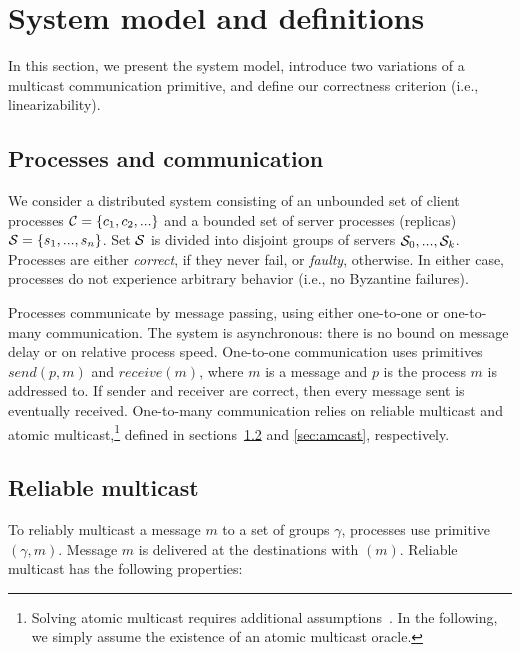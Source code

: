 \section{System model and definitions}
\label{sec:sysmodel}

In this section, we present the system model, introduce two variations of a multicast communication primitive, and define our
correctness criterion (i.e., linearizability). 

\subsection{Processes and communication}

We consider a distributed system consisting of an unbounded set of
client processes $\mathcal{C} = \{c_1, c_2, ...\}$ and a bounded set of
server processes (replicas) $\mathcal{S} = \{s_1, ..., s_n\}$.  Set $\mathcal{S}$ is
divided into disjoint groups of servers $\mathcal{S}_0, ..., \mathcal{S}_k$.
Processes are either \emph{correct}, if they never fail, or
\emph{faulty}, otherwise.  In either case, processes do not experience
arbitrary behavior (i.e., no Byzantine failures).

Processes communicate by message passing, using either one-to-one or
one-to-many communication.  The system is asynchronous: there is no
bound on message delay or on relative process speed.  One-to-one
communication uses primitives $send(p,m)$ and $receive(m)$, where $m$
is a message and $p$ is the process $m$ is addressed to.  If sender
and receiver are correct, then every message sent is eventually
received.
%
One-to-many communication relies on reliable multicast and atomic
multicast,\footnote{Solving atomic multicast requires additional
  assumptions~\cite{CT96,FLP85}. In the following, we simply assume
  the existence of an atomic multicast oracle.}  defined in
sections~\ref{sec:rmcast} and \ref{sec:amcast}, respectively.


\subsection{Reliable multicast}
\label{sec:rmcast}

To reliably multicast a message $m$ to a set of groups $\gamma$,
processes use primitive \rmcast$(\gamma, m)$.  Message $m$ is
delivered at the destinations with \rmdel$(m)$.  Reliable multicast
has the following properties:

